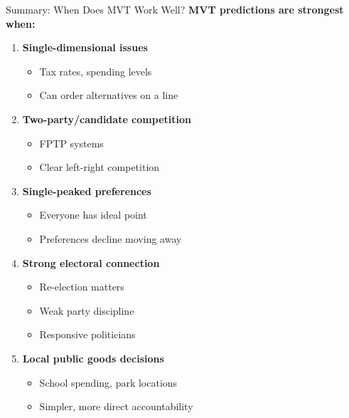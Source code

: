 \documentclass[10pt]{beamer}
\begin{document}
\begin{frame}{Summary: When Does MVT Work Well?}
\textbf{MVT predictions are strongest when:}

\begin{enumerate}
\item \textbf{Single-dimensional issues}
\begin{itemize}
\item Tax rates, spending levels
\item Can order alternatives on a line
\end{itemize}


\item \textbf{Two-party/candidate competition}
\begin{itemize}
\item FPTP systems
\item Clear left-right competition
\end{itemize}


\item \textbf{Single-peaked preferences}
\begin{itemize}
\item Everyone has ideal point
\item Preferences decline moving away
\end{itemize}


\item \textbf{Strong electoral connection}
\begin{itemize}
\item Re-election matters
\item Weak party discipline
\item Responsive politicians
\end{itemize}


\item \textbf{Local public goods decisions}
\begin{itemize}
\item School spending, park locations
\item Simpler, more direct accountability
\end{itemize}
\end{enumerate}
\end{frame}
\end{document}
